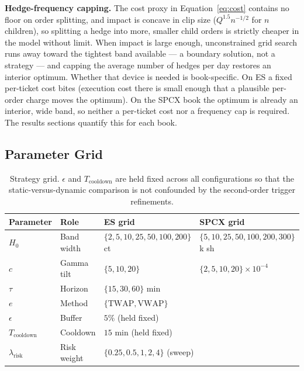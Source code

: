 \documentclass{article}
\begin{document}
\textbf{Hedge-frequency capping.} The cost proxy in Equation~\eqref{eq:cost} contains no
floor on order splitting, and impact is concave in clip size ($Q^{1.5}n^{-1/2}$ for $n$
children), so splitting a hedge into more, smaller child orders is strictly cheaper in the
model without limit. When impact is large enough, unconstrained grid search runs away toward
the tightest band available --- a boundary solution, not a strategy --- and capping the
average number of hedges per day restores an interior optimum. Whether that device is needed
is book-specific. On ES a fixed per-ticket cost bites (execution cost there is small enough
that a plausible per-order charge moves the optimum). On the SPCX book the optimum is already
an interior, wide band, so neither a per-ticket cost nor a frequency cap is required. The
results sections quantify this for each book.

\subsection{Parameter Grid}

\begin{table}[htbp]
\centering
\footnotesize
\setlength{\tabcolsep}{4pt}
\begin{tabular}{llll}
\toprule
\textbf{Parameter} & \textbf{Role} & \textbf{ES grid} & \textbf{SPCX grid} \\
\midrule
$H_0$ & Band width & $\{2,5,10,25,50,100,200\}$ ct & $\{5,10,25,50,100,200,300\}$k sh \\
$c$   & Gamma tilt & $\{5, 10, 20\}$               & $\{2,5,10,20\}\times10^{-4}$ \\
$\tau$ & Horizon   & \multicolumn{2}{l}{$\{15, 30, 60\}$ min} \\
$e$   & Method     & \multicolumn{2}{l}{$\{\text{TWAP}, \text{VWAP}\}$} \\
$\epsilon$ & Buffer & \multicolumn{2}{l}{$5\%$ (held fixed)} \\
$T_{\text{cooldown}}$ & Cooldown & \multicolumn{2}{l}{$15$ min (held fixed)} \\
\midrule
$\lambda_{\text{risk}}$ & Risk weight & \multicolumn{2}{l}{$\{0.25, 0.5, 1, 2, 4\}$ (sweep)} \\
\bottomrule
\end{tabular}
\caption{Strategy grid. $\epsilon$ and $T_{\text{cooldown}}$ are held fixed across all
configurations so that the static-versus-dynamic comparison is not confounded by the
second-order trigger refinements.}
\label{tab:grid}
\end{table}
\end{document}
